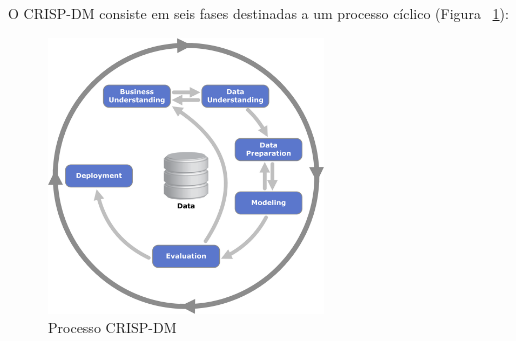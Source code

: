 O CRISP-DM consiste em seis fases destinadas a um processo cíclico (Figura ~\ref{fig:crisp-dm}):

\begin{figure}
  \centering
  \includegraphics[width=0.65\textwidth]{crisp-dm}%
  \caption{Processo CRISP-DM}
  \label{fig:crisp-dm}
\end{figure}

